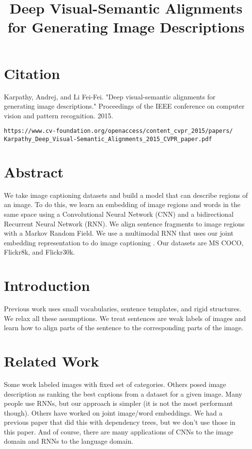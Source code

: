 \documentclass[a4paper]{article}
\title{Deep Visual-Semantic Alignments for Generating Image Descriptions}
\date{}
\begin{document}
\maketitle

\section{Citation}
Karpathy, Andrej, and Li Fei-Fei. "Deep visual-semantic alignments for generating image descriptions." Proceedings of the IEEE conference on computer vision and pattern recognition. 2015.

\begin{verbatim}
https://www.cv-foundation.org/openaccess/content_cvpr_2015/papers/
Karpathy_Deep_Visual-Semantic_Alignments_2015_CVPR_paper.pdf
\end{verbatim}

\section{Abstract}
We take image captioning datasets and build a model that can describe regions
of an image. To do this, we learn an embedding of image regions and words in
the same space using a Convolutional Neural Network (CNN) and a bidirectional 
Recurrent Neural Network (RNN). We align sentence fragments to image 
regions with a Markov Random Field. We use a multimodal
RNN that uses our joint embedding representation to do image captioning . 
Our datasets are MS COCO, Flickr8k, and Flickr30k.

\section{Introduction}
Previous work uses small vocabularies, sentence templates, and rigid structures.
We relax all these assumptions. We treat sentences are weak labels of images
and learn how to align parts of the sentence to the corresponding parts of the
image.

\section{Related Work}
Some work labeled images with fixed set of categories. Others posed image
description as ranking the best captions from a dataset for a given image.
Many people use RNNs, but our approach is simpler (it is not the most
performant though). Others have worked on joint image/word embeddings.
We had a previous paper that did this with dependency trees, but we don't
use those in this paper. And of course, there are many applications of
CNNs to the image domain and RNNs to the language domain.
\end{document}
